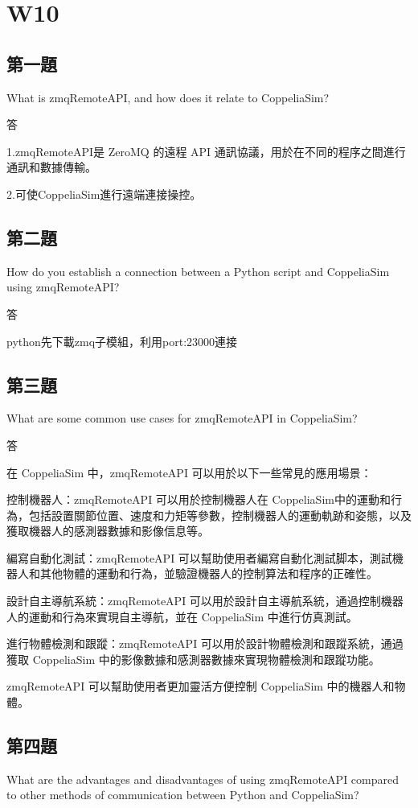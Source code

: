 \chapter{W10}
\section{第一題}
What is zmqRemoteAPI, and how does it relate to CoppeliaSim?

答

1.zmqRemoteAPI是 ZeroMQ 的遠程 API 通訊協議，用於在不同的程序之間進行通訊和數據傳輸。

2.可使CoppeliaSim進行遠端連接操控。


\section{第二題}
How do you establish a connection between a Python script and CoppeliaSim using zmqRemoteAPI?

答

python先下載zmq子模組，利用port:23000連接


\section{第三題}
What are some common use cases for zmqRemoteAPI in CoppeliaSim?

答

在 CoppeliaSim 中，zmqRemoteAPI 可以用於以下一些常見的應用場景：

控制機器人：zmqRemoteAPI 可以用於控制機器人在 CoppeliaSim中的運動和行為，包括設置關節位置、速度和力矩等參數，控制機器人的運動軌跡和姿態，以及獲取機器人的感測器數據和影像信息等。

編寫自動化測試：zmqRemoteAPI 可以幫助使用者編寫自動化測試脚本，測試機器人和其他物體的運動和行為，並驗證機器人的控制算法和程序的正確性。

設計自主導航系統：zmqRemoteAPI 可以用於設計自主導航系統，通過控制機器人的運動和行為來實現自主導航，並在 CoppeliaSim 中進行仿真測試。

進行物體檢測和跟蹤：zmqRemoteAPI 可以用於設計物體檢測和跟蹤系統，通過獲取 CoppeliaSim 中的影像數據和感測器數據來實現物體檢測和跟蹤功能。

zmqRemoteAPI 可以幫助使用者更加靈活方便控制 CoppeliaSim 中的機器人和物體。


\section{第四題}
What are the advantages and disadvantages of using zmqRemoteAPI compared to other methods of communication between Python and CoppeliaSim?

